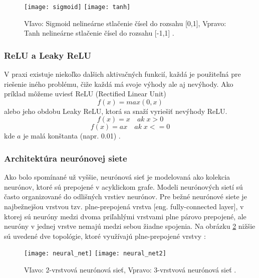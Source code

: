 \begin{figure}[H]
    \centering
    \texttt{[image: sigmoid]}
    \qquad
    \texttt{[image: tanh]}
    \caption{
        Vľavo: Sigmoid nelineárne stlačenie čísel do rozsahu [0,1],
        Vpravo: Tanh nelineárne stlačenie čísel do rozsahu [-1,1] \cite{odkaz:ConvolutionalNeuralNetworkCS231n}.
    }
    \label{pic:ActivationFunctions}
\end{figure}

\subsubsection{ReLU a Leaky ReLU}
V praxi existuje niekoľko dalšich aktivačných funkcií, každá je použiteľná pre riešenie iného problému,
    čiže každá má svoje výhody ale aj nevýhody.
Ako príklad môžeme uviesť ReLU (Rectified Linear Unit)
\begin{equation}
    f(x) = max(0,x)
\end{equation}
alebo jeho obdobu Leaky ReLU, ktorá sa snaží vyriešiť nevýhody ReLU.
\begin{equation}
    f(x) = x \quad ak \; x > 0
\end{equation}
\begin{equation}
    f(x) = ax \quad ak \; x <= 0
\end{equation}
kde $a$ je malá konštanta (napr. 0.01) \cite{odkaz:ConvolutionalNeuralNetworkCS231n}.

\subsubsection{Architektúra neurónovej siete}
Ako bolo spomínané už vyššie, neurónová sieť je modelovaná ako kolekcia neurónov, ktoré sú prepojené v acyklickom grafe.
Modeli neurónových sietí sú často organizované do odlišných vrstiev neurónov.
Pre bežné neurónové siete je najbežnejšou vrstvou tzv. plne-prepojená vrstva [eng. fully-connected layer],
    v ktorej sú neuróny medzi dvoma priľahlými vrstvami plne párovo prepojené, ale neuróny v jednej vrstve nemajú medzi sebou žiadne spojenia.
Na obrázku \ref{pic:NeuralNetworkArchitecture} nižšie sú uvedené dve topológie, ktoré využívajú plne-prepojené vrstvy \cite{odkaz:ConvolutionalNeuralNetworkCS231n}:
\begin{figure}[H]
    \centering
    \texttt{[image: neural\_net]}
    \qquad
    \texttt{[image: neural\_net2]}
    \caption{Vľavo: 2-vrstvová neurónová sieť, Vpravo: 3-vrstvová neurónová sieť \cite{odkaz:ConvolutionalNeuralNetworkCS231n}.}
    \label{pic:NeuralNetworkArchitecture}
\end{figure}

